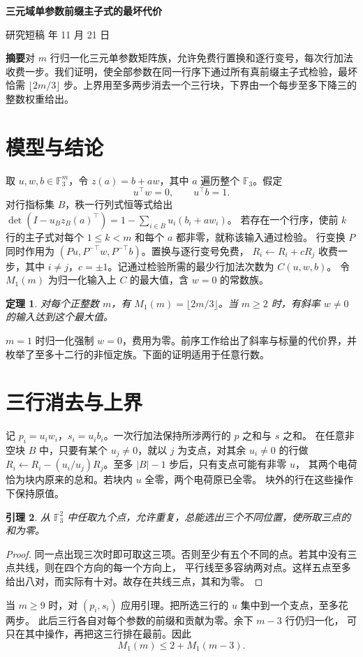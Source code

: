 \documentclass[UTF8,scheme=plain,a4paper,11pt]{ctexart}
\newcommand{\F}{\mathbb F_3}
\newcommand{\cost}{\lfloor 2m/3\rfloor}
\newtheorem{thm}{定理}
\newtheorem{lem}[thm]{引理}
\begin{document}
\fontsize{12}{18}\selectfont
\begin{center}
{\LARGE\bfseries 三元域单参数前缀主子式的最坏代价\par}
\medskip 研究短稿  年 11 月 21 日
\end{center}
\noindent\textbf{摘要}\quad 对 $m$ 行归一化三元单参数矩阵族，允许免费行置换和逐行变号，每次行加法收费一步。我们证明，使全部参数在同一行序下通过所有真前缀主子式检验，最坏恰需 $\cost$ 步。上界用至多两步消去一个三行块，下界由一个每步至多下降三的整数权重给出。

\section{模型与结论}
取 $u,w,b\in\F^m$，令 $z(a)=b+aw$，其中 $a$ 遍历整个 $\F$。假定
\[
             u^\top w=0,\qquad u^\top b=1 .
\]
对行指标集 $B$，秩一行列式恒等式给出
$\det(I-u_Bz_B(a)^\top)=1-\sum_{i\in B}u_i(b_i+aw_i)$。
若存在一个行序，使前 $k$ 行的主子式对每个 $1\le k<m$ 和每个 $a$ 都非零，就称该输入通过检验。
行变换 $P$ 同时作用为 $(Pu,P^{-\top}w,P^{-\top}b)$。置换与逐行变号免费，
$R_i\gets R_i+cR_j$ 收费一步，其中 $i\ne j$，$c=\pm1$。记通过检验所需的最少行加法次数为 $C(u,w,b)$。
令 $M_1(m)$ 为归一化输入上 $C$ 的最大值，含 $w=0$ 的常数族。
\begin{thm}对每个正整数 $m$，有 $M_1(m)=\cost$。当 $m\ge2$ 时，有斜率 $w\ne0$ 的输入达到这个最大值。\end{thm}
$m=1$ 时归一化强制 $w=0$，费用为零。前序工作给出了斜率与标量的代价界，并枚举了至多十二行的非恒定族\cite{prior,census}。下面的证明适用于任意行数。

\section{三行消去与上界}
记 $p_i=u_iw_i$，$s_i=u_ib_i$。一次行加法保持所涉两行的 $p$ 之和与 $s$ 之和。
在任意非空块 $B$ 中，只要有某个 $u_j\ne0$，就以 $j$ 为支点，对其余 $u_i\ne0$ 的行做
$R_i\gets R_i-(u_i/u_j)R_j$。至多 $|B|-1$ 步后，只有支点可能有非零 $u$，
其两个电荷恰为块内原来的总和。若块内 $u$ 全零，两个电荷原已全零。
块外的行在这些操作下保持原值。
\begin{lem}从 $\F^2$ 中任取九个点，允许重复，总能选出三个不同位置，使所取三点的和为零。\end{lem}
\begin{proof}
同一点出现三次时即可取这三项。否则至少有五个不同的点。若其中没有三点共线，则在四个方向的每一个方向上，
平行线至多容纳两对点。这样五点至多给出八对，而实际有十对。故存在共线三点，其和为零。
\end{proof}
\newpage
当 $m\ge9$ 时，对 $(p_i,s_i)$ 应用引理。把所选三行的 $u$ 集中到一个支点，至多花两步。
此后三行各自对每个参数的前缀和贡献为零。余下 $m-3$ 行仍归一化，
可只在其中操作，再把这三行排在最前。因此
\[
                    M_1(m)\le 2+M_1(m-3).
\]
\end{document}
